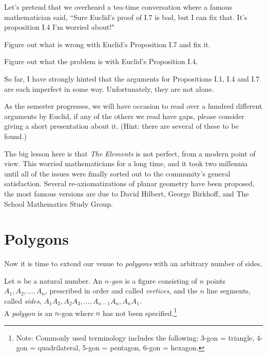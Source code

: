 Let's pretend that we overheard a tea-time conversation where a famous mathematician said, ``Sure Euclid's proof of I.7 is bad, but I can fix that.
It's proposition I.4 I'm worried about!"

\begin{problem}\label{prob:fix-I.7}
Figure out what is wrong with Euclid's Proposition I.7 and fix it.
\end{problem}

\begin{problem}\label{prob:fix-I.4}
Figure out what the problem is with Euclid's Proposition I.4.
\end{problem}

So far, I have strongly hinted that the arguments for Propositions I.1, I.4 and I.7 are each imperfect in some way.
Unfortunately, they are not alone.

\begin{problem}
As the semester progresses, we will have occasion to read over a hundred different arguments by Euclid, if any of the others we read have gaps, please consider giving a short presentation about it.
(Hint: there are several of these to be found.)
\end{problem}

The big lesson here is that \emph{The Elements} is not perfect, from a modern point of view.
This worried mathematicians for a long time, and it took two millennia until all of the issues were finally sorted out to the community's general satisfaction.
Several re-axiomatizations of planar geometry have been proposed, the most famous versions are due to David Hilbert, George Birkhoff, and The School Mathematics Study Group.



\chapter{Polygons}
Now it is time to extend our venue to \emph{polygons} with an arbitrary number of sides.

\begin{definition}\label{defn:n-gon}
Let $n$ be a natural number. An \emph{$n$-gon} is a figure consisting of $n$ points $A_1, A_2, \ldots, A_n$, prescribed in order and called \emph{vertices}, and the $n$ line segments, called \emph{sides}, $A_1A_2, A_2A_3, \ldots, A_{n-1}A_n, A_nA_1$.\\
A \emph{polygon} is an $n$-gon where $n$ has not been specified.\footnote{Note: Commonly used terminology includes the following: 3-gon = triangle, 4-gon = quadrilateral, 5-gon = pentagon, 6-gon = hexagon.}
\end{definition}



